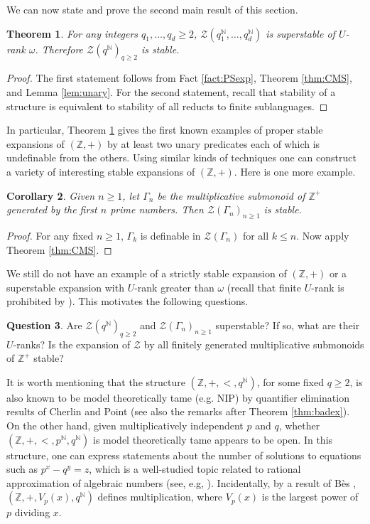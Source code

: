 \documentclass{amsart}
\newcommand{\cZ}{\mathcal{Z}}
\def\N{\mathbb N}
\def\Z{\mathbb Z}
\newtheorem{theorem}{Theorem}[section]
\newtheorem{corollary}[theorem]{Corollary}
\theoremstyle{definition}
\newtheorem{question}[theorem]{Question}
\begin{document}
We can now state and prove the second main result of this section.

\begin{theorem}\label{thm:MUP}
For any integers $q_1,\ldots,q_d\geq 2$, $\cZ(q_1^{\N},\ldots,q_d^{\N})$ is superstable of $U$-rank $\omega$. Therefore  $\cZ(q^{\N})_{q\geq 2}$ is stable.
\end{theorem}
\begin{proof}
The first statement follows from Fact \ref{fact:PSexp}, Theorem \ref{thm:CMS}, and Lemma \ref{lem:unary}. For the second statement, recall that stability of a structure is equivalent to stability of all reducts to finite sublanguages.
\end{proof}


In particular, Theorem \ref{thm:MUP} gives the first known examples of proper stable expansions of $(\Z,+)$ by at least two unary predicates each of which is undefinable from the others. Using similar kinds of techniques one can construct a variety of interesting stable expansions of $(\Z,+)$. Here is one more example.

\begin{corollary}
Given $n\geq 1$, let $\Gamma_n$ be the multiplicative submonoid of $\Z^+$ generated by the first $n$ prime numbers. Then $\cZ(\Gamma_n)_{n\geq 1}$ is stable.
\end{corollary}
\begin{proof}
For any fixed $n\geq 1$, $\Gamma_k$ is definable in $\cZ(\Gamma_n)$ for all $k\leq n$. Now apply Theorem \ref{thm:CMS}.
\end{proof}


We still do not have an example of a strictly stable expansion of $(\Z,+)$ or a superstable expansion with $U$-rank greater than $\omega$ (recall that finite $U$-rank is prohibited by \cite{PaSk}). This motivates the following questions.

\begin{question}
Are $\cZ(q^{\N})_{q\geq 2}$ and $\cZ(\Gamma_n)_{n\geq 1}$ superstable? If so, what are their $U$-ranks? Is the expansion of $\cZ$ by all finitely generated multiplicative submonoids of $\Z^+$ stable?
\end{question}

It is worth mentioning  that the structure $(\Z,+,<,q^{\N})$, for some fixed $q\geq 2$, is also known to be model theoretically tame (e.g. NIP) by quantifier elimination results of Cherlin and Point \cite{ChPo} (see also the remarks after Theorem \ref{thm:badex}). On the other hand, given multiplicatively independent $p$ and $q$, whether $(\Z,+,<,p^\N,q^\N)$ is model theoretically tame appears to be open. In this structure, one can express statements about the number of solutions to equations such as $p^x-q^y=z$, which is a well-studied topic related to rational approximation of algebraic numbers  (see, e.g, \cite{StTij}).  Incidentally, by a result of B\`{e}s \cite{Bes2}, $(\Z,+,V_p(x),q^{\N})$ defines multiplication, where $V_p(x)$ is the largest power of $p$ dividing $x$.
\end{document}
